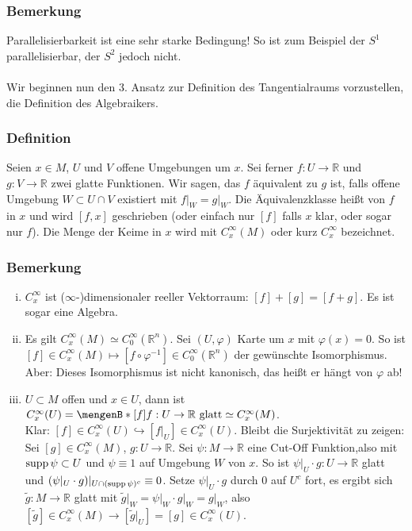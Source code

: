 \subsubsection{Bemerkung}
\label{ssub:145}
Parallelisierbarkeit ist eine sehr starke Bedingung! So ist zum Beispiel der $S^1$ parallelisierbar, der $S^2$ jedoch nicht.
\\
\\
Wir beginnen nun den 3. Ansatz zur Definition des Tangentialraums vorzustellen, die Definition des Algebraikers.

\subsubsection{Definition}
\label{ssub:146}
Seien $x \in M$, $U$ und $V$ offene Umgebungen um $x$. Sei ferner $f:U\to \mathds{R}$ und $g:V\to \mathds{R}$ zwei glatte Funktionen. Wir sagen, das $f$ äquivalent zu $g$ ist, falls offene Umgebung $W\subset U\cap V$ existiert mit $f\vert_W = g\vert_W$. Die Äquivalenzklasse heißt  von $f$ in $x$ und wird $[f,x]$ geschrieben (oder einfach nur $[f]$ falls $x$ klar, oder sogar nur $f$). Die Menge der Keime in $x$ wird mit $C^\infty_x (M)$ oder kurz $C^\infty_x$ bezeichnet.

\subsubsection{Bemerkung}
\label{ssub:147}
\begin{enumerate}[(i)]
\item $C^\infty_x$ ist ($\infty$-)dimensionaler reeller Vektorraum: $[f]+[g]=[f+g]$. Es ist sogar eine Algebra.
\item Es gilt $C_x^\infty (M) \simeq C_0^\infty (\mathds{R}^n)$. Sei $(U,\varphi)$ Karte um $x$ mit $\varphi(x) = 0$. So ist $[f]\in C_x^\infty (M) \mapsto [f\circ \varphi^{-1}]\in C_0^\infty (\mathds{R}^n)$ der gewünschte Isomorphismus.
Aber: Dieses Isomorphismus ist nicht kanonisch, das heißt er hängt von $\varphi$ ab!
\item $U\subset M$ offen und $x\in U$, dann ist $C_x^\infty(U) = \set[\benbrace{f}]{f:U\to \mathds{R}\ \text{glatt}} \simeq C_x^\infty (M)$.\\
Klar: $[f]\in C_x^\infty (U) \hookrightarrow [f\vert_U]\in C_x^\infty (U)$. Bleibt die Surjektivität zu zeigen: Sei $[g]\in C_x^\infty (M)$, $g:U\to \mathds{R}$. Sei $\psi: M \to \mathds{R}$ eine Cut-Off Funktion,also mit $\operatorname{supp} \psi \subset U$ und $\psi \equiv 1$ auf Umgebung $W$ von $x$. So ist $\psi\vert_U \cdot g: U \to \mathds{R}$ glatt und $(\psi\vert_U \cdot g)\vert_{U\cap (\operatorname{supp} \psi)^c} \equiv 0$. Setze $\psi\vert_U \cdot g$ durch $0$ auf $U^c$ fort, es ergibt sich $\tilde{g}:M\to \mathds{R}$ glatt mit $\tilde{g}\vert_W = \psi\vert_W \cdot g\vert_W = g\vert_W$, also $[\tilde{g}]\in C_x^\infty (M) \to [\tilde{g}\vert_U] = [g] \in C_x^\infty(U)$.
\end{enumerate}

